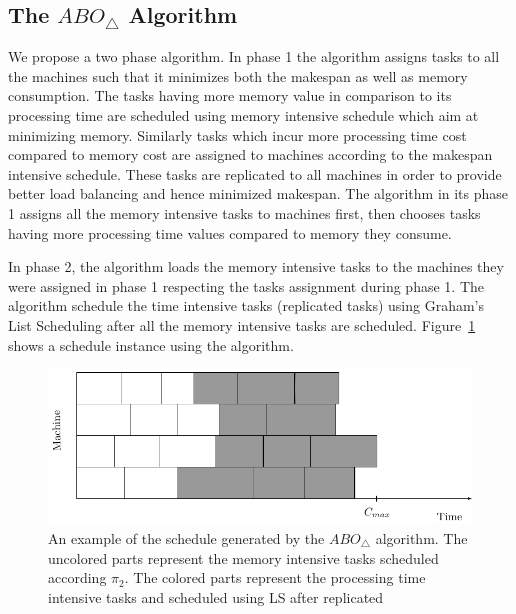 \documentclass[twocolumn]{svjour3}
\begin{document}
\subsection{The $ABO_\triangle$ Algorithm} 

We propose a two phase algorithm. In phase 1 the algorithm assigns
tasks to all the machines such that it minimizes both the makespan as
well as memory consumption. The tasks having more memory value in
comparison to its processing time are scheduled using memory intensive
schedule which aim at minimizing memory.  Similarly tasks which incur
more processing time cost compared to memory cost are assigned to
machines according to the makespan intensive schedule. These tasks are
replicated to all machines in order to provide better load balancing
and hence minimized makespan. The algorithm in its phase 1 assigns all
the memory intensive tasks to machines first, then chooses tasks
having more processing time values compared to memory they consume.
    
In phase 2, the algorithm loads the memory intensive tasks to the
machines they were assigned in phase 1 respecting the tasks assignment
during phase 1. The algorithm schedule the time intensive tasks
(replicated tasks) using Graham's List Scheduling after all the memory
intensive tasks are scheduled. Figure~\ref{fig:ch5-2} shows a schedule
instance using the algorithm.
    
\begin{figure}[htp]
  \centering
  \includegraphics[width= 16 cm]{mem.pdf}
  \caption{An example of the schedule generated by the $ABO_\triangle$
    algorithm. The uncolored parts represent the memory intensive
    tasks scheduled according $\pi_2$. The colored parts represent the
    processing time intensive tasks and scheduled using LS after
    replicated}
  \label{fig:ch5-2}
\end{figure}
\end{document}
